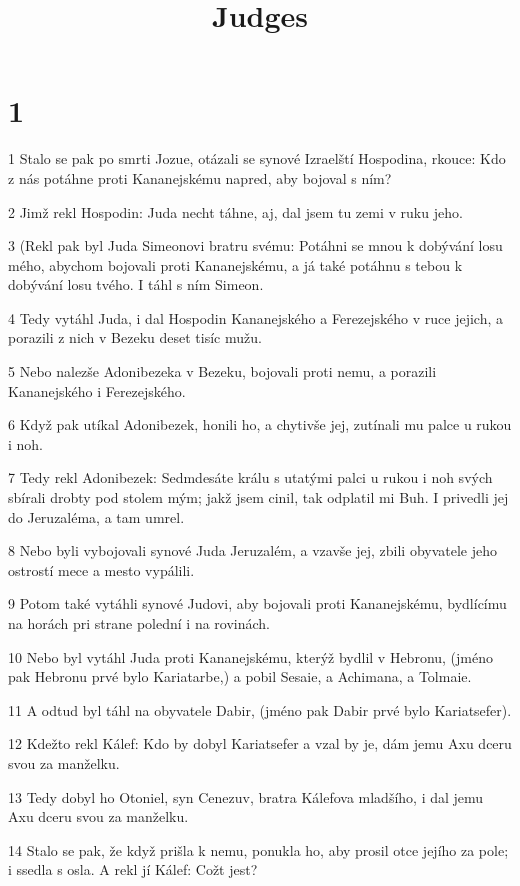 

\title{Judges}

\chapter{1}

\par 1 Stalo se pak po smrti Jozue, otázali se synové Izraelští Hospodina, rkouce: Kdo z nás potáhne proti Kananejskému napred, aby bojoval s ním?
\par 2 Jimž rekl Hospodin: Juda necht táhne, aj, dal jsem tu zemi v ruku jeho.
\par 3 (Rekl pak byl Juda Simeonovi bratru svému: Potáhni se mnou k dobývání losu mého, abychom bojovali proti Kananejskému, a já také potáhnu s tebou k dobývání losu tvého. I táhl s ním Simeon.
\par 4 Tedy vytáhl Juda, i dal Hospodin Kananejského a Ferezejského v ruce jejich, a porazili z nich v Bezeku deset tisíc mužu.
\par 5 Nebo nalezše Adonibezeka v Bezeku, bojovali proti nemu, a porazili Kananejského i Ferezejského.
\par 6 Když pak utíkal Adonibezek, honili ho, a chytivše jej, zutínali mu palce u rukou i noh.
\par 7 Tedy rekl Adonibezek: Sedmdesáte králu s utatými palci u rukou i noh svých sbírali drobty pod stolem mým; jakž jsem cinil, tak odplatil mi Buh. I privedli jej do Jeruzaléma, a tam umrel.
\par 8 Nebo byli vybojovali synové Juda Jeruzalém, a vzavše jej, zbili obyvatele jeho ostrostí mece a mesto vypálili.
\par 9 Potom také vytáhli synové Judovi, aby bojovali proti Kananejskému, bydlícímu na horách pri strane polední i na rovinách.
\par 10 Nebo byl vytáhl Juda proti Kananejskému, kterýž bydlil v Hebronu, (jméno pak Hebronu prvé bylo Kariatarbe,) a pobil Sesaie, a Achimana, a Tolmaie.
\par 11 A odtud byl táhl na obyvatele Dabir, (jméno pak Dabir prvé bylo Kariatsefer).
\par 12 Kdežto rekl Kálef: Kdo by dobyl Kariatsefer a vzal by je, dám jemu Axu dceru svou za manželku.
\par 13 Tedy dobyl ho Otoniel, syn Cenezuv, bratra Kálefova mladšího, i dal jemu Axu dceru svou za manželku.
\par 14 Stalo se pak, že když prišla k nemu, ponukla ho, aby prosil otce jejího za pole; i ssedla s osla. A rekl jí Kálef: Cožt jest?
